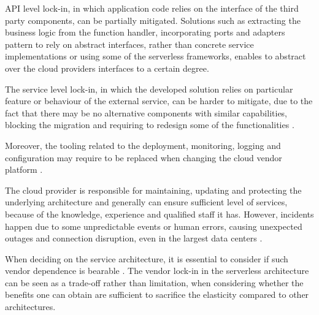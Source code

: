 API level lock-in, in which application code relies on the interface of the third party components, can be partially mitigated.
Solutions such as extracting the business logic from the function handler, incorporating ports and adapters pattern to rely on abstract interfaces, rather than concrete service implementations or using some of the serverless frameworks, enables to abstract over the cloud providers interfaces to a certain degree.

The service level lock-in, in which the developed solution relies on particular feature or behaviour of the external service, can be harder to mitigate, due to the fact that there may be no alternative components with similar capabilities, blocking the migration and requiring to redesign some of the functionalities \cite{EvaluationOfServerlessApplicationProgrammingModel}.

Moreover, the tooling related to the deployment, monitoring, logging and configuration may require to be replaced when changing the cloud vendor platform \cite{MartinFowlerServerless}.

The cloud provider is responsible for maintaining, updating and protecting the underlying architecture and generally can ensure sufficient level of services, because of the knowledge, experience and qualified staff it has. However, incidents happen due to some unpredictable events or human errors, causing unexpected outages and connection disruption, even in the largest data centers \cite{EvaluationOfServerlessApplicationProgrammingModel}.

When deciding on the service architecture, it is essential to consider if such vendor dependence is bearable \cite{LeveragingServerlessCloudComputingArchitectures}.
The vendor lock-in in the serverless architecture can be seen as a trade-off rather than limitation, when considering whether the benefits one can obtain are sufficient to sacrifice the elasticity compared to other architectures.




